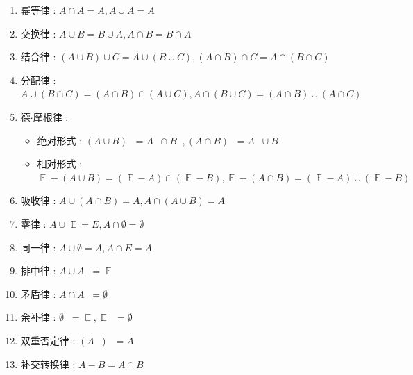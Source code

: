 \documentclass[UTF8,12pt]{ctexbook}
\DeclareMathOperator{\mathEverythingCollection}{\mathbb{E}}
\DeclareMathOperator{\unionSet}{\cup}
\DeclareMathOperator{\intersectionSet}{\cap}
\DeclareMathOperator{\absoluteCompletementSet}{^\complement}
\begin{document}
{{{{{  \begin{enumerate}
    \item 幂等律 : $A \intersectionSet A = A, A \unionSet A = A$
    \item 交换律 : $A \unionSet B = B \unionSet A,A \intersectionSet B = B \intersectionSet A$
    \item 结合律 : $(A \unionSet B) \unionSet C = A \unionSet (B \unionSet C),(A \intersectionSet B) \intersectionSet C = A \intersectionSet (B \intersectionSet C)$
    \item 分配律 : $A \unionSet (B \intersectionSet C) = (A \intersectionSet B) \intersectionSet (A \unionSet C), A \intersectionSet (B \unionSet C) = (A \intersectionSet B) \unionSet (A \intersectionSet C)$
    \item 德$\cdot$摩根律 : \begin{itemize}
            \item 绝对形式 : $(A \unionSet B)\absoluteCompletementSet = A\absoluteCompletementSet \intersectionSet B\absoluteCompletementSet,(A \intersectionSet B)\absoluteCompletementSet = A\absoluteCompletementSet \unionSet B\absoluteCompletementSet$
            \item 相对形式 : $\mathEverythingCollection - (A \unionSet B) = (\mathEverythingCollection - A) \intersectionSet (\mathEverythingCollection - B),\mathEverythingCollection - (A \intersectionSet B) = (\mathEverythingCollection - A) \unionSet (\mathEverythingCollection - B)$
          \end{itemize}
    \item 吸收律 : $A \unionSet (A \intersectionSet B) = A,A \intersectionSet (A \unionSet B) = A$
    \item 零律 : $A \unionSet \mathEverythingCollection = E,A \intersectionSet \emptyset = \emptyset$
    \item 同一律 : $A \unionSet \emptyset = A,A \intersectionSet E = A$
    \item 排中律 : $A \unionSet A\absoluteCompletementSet = \mathEverythingCollection$
    \item 矛盾律 : $A \intersectionSet A\absoluteCompletementSet = \emptyset$
    \item 余补律 : $\emptyset\absoluteCompletementSet = \mathEverythingCollection,\mathEverythingCollection\absoluteCompletementSet = \emptyset$
    \item 双重否定律 : $(A\absoluteCompletementSet)\absoluteCompletementSet = A$
    \item 补交转换律 : $A - B = A \intersectionSet B\absoluteCompletementSet$
  \end{enumerate}
}%

}}}}
\end{document}
